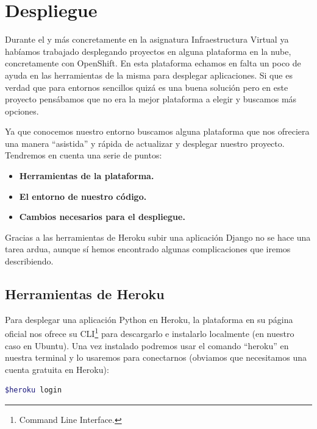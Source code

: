 \chapter{Despliegue}

\bigskip
Durante el {\grado} y más concretamente en la asignatura Infraestructura Virtual ya habíamos trabajado desplegando proyectos en alguna plataforma en la nube, concretamente con OpenShift. En esta plataforma echamos en falta un poco de ayuda en las herramientas de la misma para desplegar aplicaciones. Si que es verdad que para entornos sencillos quizá es una buena solución pero en este proyecto pensábamos que no era la mejor plataforma a elegir y buscamos más opciones.

\bigskip
Ya que conocemos nuestro entorno buscamos alguna plataforma que nos ofreciera una manera ``asistida'' y rápida de actualizar y desplegar nuestro proyecto. Tendremos en cuenta una serie de puntos:

  \begin{itemize}
    \item \textbf{Herramientas de la plataforma.}
    \item \textbf{El entorno de nuestro código.}
    \item \textbf{Cambios necesarios para el despliegue.}
  \end{itemize}

\bigskip
Gracias a las herramientas de Heroku subir una aplicación Django no se hace una tarea ardua, aunque sí hemos encontrado algunas complicaciones que iremos describiendo.


\section{Herramientas de Heroku}

\bigskip
Para desplegar una aplicación Python en Heroku, la plataforma en su página oficial nos ofrece su CLI\footnote{Command Line Interface.} para descargarlo e instalarlo localmente (en nuestro caso en Ubuntu).
Una vez instalado podremos usar el comando ``heroku'' en nuestra terminal y lo usaremos para conectarnos (obviamos que necesitamos una cuenta gratuita en Heroku):



\begin{lstlisting}[language=bash]
  $heroku login 
\end{lstlisting}

